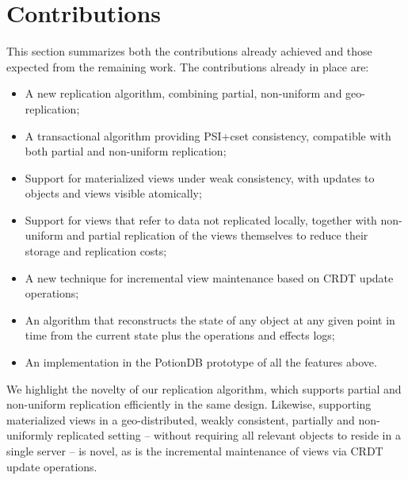 %

\section{Contributions}
\label{sec:contributions}

This section summarizes both the contributions already achieved and those expected from the remaining work.
The contributions already in place are:

\begin{itemize}
	\item A new replication algorithm, combining partial, non-uniform and geo-replication;
	\item A transactional algorithm providing PSI+cset consistency, compatible with both partial and non-uniform replication;
	\item Support for materialized views under weak consistency, with updates to objects and views visible atomically;
	\item Support for views that refer to data not replicated locally, together with non-uniform and partial replication of the views themselves to reduce their storage and replication costs;
	\item A new technique for incremental view maintenance based on CRDT update operations;
	\item An algorithm that reconstructs the state of any object at any given point in time from the current state plus the operations and effects logs;
	\item An implementation in the PotionDB prototype of all the features above.
\end{itemize}

We highlight the novelty of our replication algorithm, which supports partial and non-uniform replication efficiently in the same design.
Likewise, supporting materialized views in a geo-distributed, weakly consistent, partially and non-uniformly replicated setting -- without requiring all relevant objects to reside in a single server -- is novel, as is the incremental maintenance of views via CRDT update operations.


